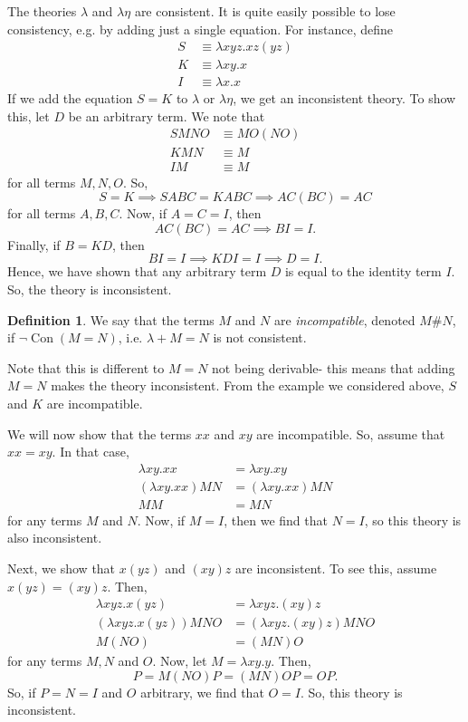 \documentclass[a4paper, openany]{memoir}
\theoremstyle{definition}
\newtheorem{definition}[proposition]{Definition}
\begin{document}
    The theories $\lambda$ and $\lambda \eta$ are consistent. It is quite easily possible to lose consistency, e.g. by adding just a single equation. For instance, define
    \begin{align*}
        S &\equiv \lambda xyz.xz(yz) \\
        K &\equiv \lambda xy.x \\
        I &\equiv \lambda x.x
    \end{align*}
    If we add the equation $S = K$ to $\lambda$ or $\lambda \eta$, we get an inconsistent theory. To show this, let $D$ be an arbitrary term. We note that
    \begin{align*}
        SMNO &\equiv MO(NO) \\
        KMN &\equiv M \\
        IM &\equiv M
    \end{align*}
    for all terms $M, N, O$. So,
    \[S = K \implies SABC = KABC \implies AC(BC) = AC\]
    for all terms $A, B, C$. Now, if $A = C = I$, then
    \[AC(BC) = AC \implies BI = I.\]
    Finally, if $B = KD$, then
    \[BI = I \implies KDI = I \implies D = I.\]
    Hence, we have shown that any arbitrary term $D$ is equal to the identity term $I$. So, the theory is inconsistent.

    \begin{definition}
        We say that the terms $M$ and $N$ are \emph{incompatible}, denoted $M\#N$, if $\lnot \operatorname{Con}(M = N)$, i.e. $\lambda + M = N$ is not consistent.
    \end{definition}
    \noindent Note that this is different to $M = N$ not being derivable- this means that adding $M = N$ makes the theory inconsistent. From the example we considered above, $S$ and $K$ are incompatible.

    We will now show that the terms $xx$ and $xy$ are incompatible. So, assume that $xx = xy$. In that case,
    \begin{align*}
        \lambda xy.xx &= \lambda xy.xy \\
        (\lambda xy.xx)MN &= (\lambda xy.xx)MN \\
        MM &= MN
    \end{align*}
    for any terms $M$ and $N$. Now, if $M = I$, then we find that $N = I$, so this theory is also inconsistent.

    Next, we show that $x(yz)$ and $(xy)z$ are inconsistent. To see this, assume $x(yz) = (xy)z$. Then,
    \begin{align*}
        \lambda xyz.x(yz) &= \lambda xyz.(xy)z \\
        (\lambda xyz.x(yz)) MNO &= (\lambda xyz.(xy)z) MNO \\
        M(NO) &= (MN)O
    \end{align*}
    for any terms $M, N$ and $O$. Now, let $M = \lambda xy.y$. Then,
    \[P = M(NO)P = (MN)OP = OP.\]
    So, if $P = N = I$ and $O$ arbitrary, we find that $O = I$. So, this theory is inconsistent.
\end{document}
